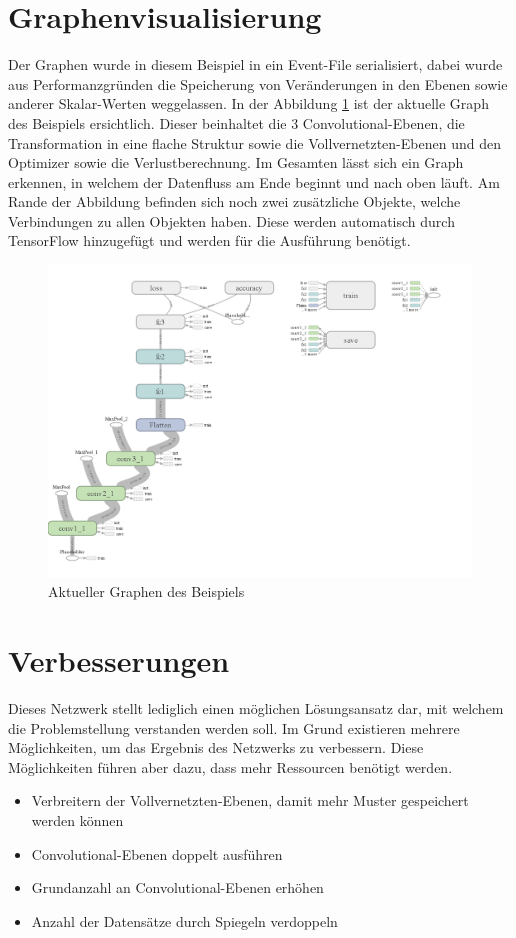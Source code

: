 \section{Graphenvisualisierung}

Der Graphen wurde in diesem Beispiel in ein Event-File serialisiert, dabei wurde aus Performanzgründen die Speicherung von Veränderungen in den Ebenen sowie anderer Skalar-Werten weggelassen. 
In der Abbildung \ref{fig:graphDig} ist der aktuelle Graph des Beispiels ersichtlich. 
Dieser beinhaltet die $3$ Convolutional-Ebenen, die Transformation in eine flache Struktur sowie die Vollvernetzten-Ebenen und den Optimizer sowie die Verlustberechnung. 
Im Gesamten lässt sich ein Graph erkennen, in welchem der Datenfluss am Ende beginnt und nach oben läuft. 
Am Rande der Abbildung befinden sich noch zwei zusätzliche Objekte, welche Verbindungen zu allen Objekten haben. 
Diese werden automatisch durch TensorFlow hinzugefügt und werden für die Ausführung benötigt. 
\begin{figure}[ht!]
	\centering
	\includegraphics[scale=0.28]{images/graph-run.png}
	\caption{Aktueller Graphen des Beispiels}
	\label{fig:graphDig}
\end{figure}

\section{Verbesserungen}

Dieses Netzwerk stellt lediglich einen möglichen Lösungsansatz dar, mit welchem die Problemstellung verstanden werden soll. 
Im Grund existieren mehrere Möglichkeiten, um das Ergebnis des Netzwerks zu verbessern. 
Diese Möglichkeiten führen aber dazu, dass mehr Ressourcen benötigt werden. 
\begin{itemize}
	\item Verbreitern der Vollvernetzten-Ebenen, damit mehr Muster gespeichert werden können
	\item Convolutional-Ebenen doppelt ausführen 
	\item Grundanzahl an Convolutional-Ebenen erhöhen
	\item Anzahl der Datensätze durch Spiegeln verdoppeln
\end{itemize}







